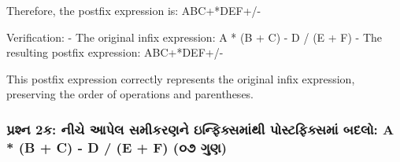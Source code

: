 Therefore, the postfix expression is: ABC+*DEF+/-

Verification: - The original infix expression: A * (B + C) - D / (E + F)
- The resulting postfix expression: ABC+*DEF+/-

This postfix expression correctly represents the original infix
expression, preserving the order of operations and parentheses.

\begin{Shaded}
\begin{Highlighting}[]
\end{Highlighting}
\end{Shaded}

\hypertarget{uxaaauxab0uxab6uxaa8-2uxa95-uxaa8uxa9a-uxa86uxaaauxab2-uxab8uxaaeuxa95uxab0uxaa3uxaa8-uxa87uxaa8uxaabuxa95uxab8uxaaeuxaa5-uxaaauxab8uxa9fuxaabuxa95uxab8uxaae-uxaacuxaa6uxab2-a-b-c---d-e-f-uxae6uxaed-uxa97uxaa3}{%
\subsubsection{પ્રશ્ન 2ક: નીચે આપેલ સમીકરણને ઇન્ફિક્સમાંથી પોસ્ટફિક્સમાં બદલો: A *
(B + C) - D / (E + F) (૦૭
ગુણ)}\label{uxaaauxab0uxab6uxaa8-2uxa95-uxaa8uxa9a-uxa86uxaaauxab2-uxab8uxaaeuxa95uxab0uxaa3uxaa8-uxa87uxaa8uxaabuxa95uxab8uxaaeuxaa5-uxaaauxab8uxa9fuxaabuxa95uxab8uxaae-uxaacuxaa6uxab2-a-b-c---d-e-f-uxae6uxaed-uxa97uxaa3}}

